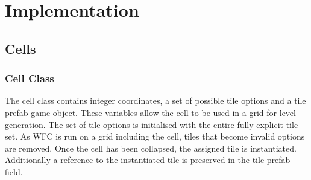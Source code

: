 \chapter{Implementation}
\section{Cells}
\subsection{Cell Class}\label{sec:cellClass}
The cell class contains integer coordinates, a set of possible tile options and a tile prefab game object. These variables allow the cell to be used in a grid for level generation. The set of tile options is initialised with the entire fully-explicit tile set. As WFC is run on a grid including the cell, tiles that become invalid options are removed. Once the cell has been collapsed, the assigned tile is instantiated. Additionally a reference to the instantiated tile is preserved in the tile prefab field.

